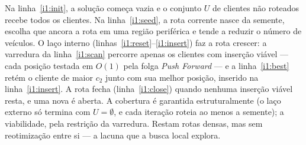 \documentclass[10pt,a4paper]{article}
\begin{document}
\begin{algorithm}[H]
\caption{\textsc{I1-Solomon} --- construção por inserção sequencial}\label{alg:i1}
\begin{algorithmic}[1]
\label{i1:init}
  \label{i1:seed}
  \REPEAT
    \label{i1:reset}
    \label{i1:scan}
        \label{i1:best}
      \ENDIF
    \ENDFOR
      \label{i1:insert}
    \ENDIF
  \label{i1:close}
\ENDWHILE
{}
\end{algorithmic}
\end{algorithm}

Na linha~\ref{i1:init}, a solução começa vazia e o conjunto $U$ de clientes não roteados recebe todos os clientes. Na linha~\ref{i1:seed}, a rota corrente nasce da semente, escolha que ancora a rota em uma região periférica e tende a reduzir o número de veículos. O laço interno (linhas~\ref{i1:reset}--\ref{i1:insert}) faz a rota crescer: a varredura da linha~\ref{i1:scan} percorre apenas os clientes com inserção viável --- cada posição testada em $O(1)$ pela folga \textit{Push Forward} --- e a linha~\ref{i1:best} retém o cliente de maior $c_2$ junto com sua melhor posição, inserido na linha~\ref{i1:insert}. A rota fecha (linha~\ref{i1:close}) quando nenhuma inserção viável resta, e uma nova é aberta. A cobertura é garantida estruturalmente (o laço externo só termina com $U=\emptyset$, e cada iteração roteia ao menos a semente); a viabilidade, pela restrição da varredura. Restam rotas densas, mas sem reotimização entre si --- a lacuna que a busca local explora.
\end{document}
